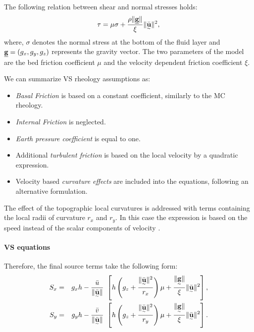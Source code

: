 \documentclass{article}
\begin{document}
The following relation between shear and normal stresses holds:
\begin{equation}
\tau = \mu \sigma + \frac{\rho \| \underline{\textbf g} \|}{\xi} \| \underset{^\sim}{\bar{\textbf u}} \|^2,
\end{equation}
where, $\sigma$ denotes the normal stress at the bottom of the fluid layer and $\underline{\textbf g} = (g_{x} , g_{y} , g_{z})$ represents the gravity vector. The two parameters of the model are the bed friction coefficient $\mu$ and the velocity dependent friction coefficient $\xi$.

We can summarize VS rheology assumptions as:
\begin{itemize}
\item \textit{Basal Friction} is based on a constant coefficient, similarly to the MC rheology.

\item \textit{Internal Friction} is neglected.

\item \textit{Earth pressure coefficient} is equal to one.

\item Additional \textit{turbulent friction} is based on the local velocity by a quadratic expression.

\item Velocity based \textit{curvature effects} are included into the equations, following an alternative formulation.
\end{itemize}

The effect of the topographic local curvatures is addressed with terms containing the local radii of curvature $r_x$ and $r_y$. In this case the expression is based on the speed instead of the scalar components of velocity \citep{PudasainiHutter2003,Fischer2012}.

\paragraph{VS equations} Therefore, the final source terms take the following form:
\begin{eqnarray}
\label{eq:S_terms_VS}
S_{x} &=&  g_{x} h - \frac{\bar{u}}{\| \underset{^\sim}{\bar{\textbf u}}\|} \ \left[ h \left(g_{z} + \frac{\| \underset{^\sim}{\bar{\textbf u}} \|^2}{r_{x}} \right)\mu+ \frac{\| \underset{^\sim}{\textbf g} \|}{\xi}\| \underset{^\sim}{\bar{\textbf u}} \|^2\right], \nonumber \\
S_{y} &=& g_{y} h - \frac{\bar{v}}{\| \underset{^\sim}{\bar{\textbf u}}\|} \ \left[ h \left(g_{z} + \frac{\| \underset{^\sim}{\bar{\textbf u}} \|^2}{r_{y}} \right)\mu+ \frac{\| \underset{^\sim}{\textbf g} \|}{\xi}\| \underset{^\sim}{\bar{\textbf u}} \|^2\right].
\end{eqnarray}
\end{document}
